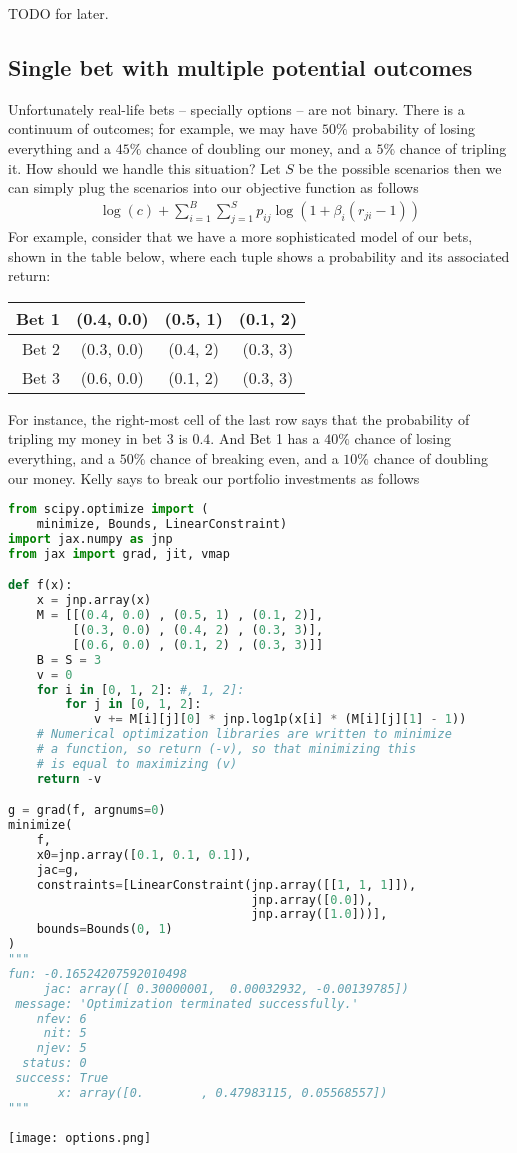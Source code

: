 \documentclass{article}
\begin{document}
TODO for later.

\subsection{Single bet with multiple potential outcomes}
Unfortunately real-life bets -- specially options -- are not binary. There is a continuum of outcomes; for example, we may have $50\%$ probability of losing everything and a $45\%$ chance of doubling our money, and a $5\%$ chance of tripling it. How should we handle this situation? Let $S$ be the possible scenarios then we can simply plug the scenarios into our objective function as follows
\begin{align}
\log(c) + \sum_{i=1}^B \sum_{j=1}^S p_{ij} \log(1 + \beta_i (r_{ji} -1)) 
\end{align}
For example, consider that we have a more sophisticated model of our bets, shown in the table below, where each tuple shows a probability and its associated return:

\begin{tabular}{r|c|c|c}
     Bet 1& (0.4, 0.0) & (0.5, 1) & (0.1, 2)\\\hline
     Bet 2& (0.3, 0.0) & (0.4, 2) & (0.3, 3)\\\hline
     Bet 3& (0.6, 0.0) & (0.1, 2) & (0.3, 3)\\
\end{tabular}

For instance, the right-most cell of the last row says that the probability of tripling my money in bet 3 is $0.4$. And Bet 1 has a $40\%$ chance of losing everything, and a $50\%$ chance of breaking even, and a $10\%$ chance of doubling our money. Kelly says to break our portfolio investments as follows

\begin{lstlisting}[language=Python]
from scipy.optimize import (
    minimize, Bounds, LinearConstraint)
import jax.numpy as jnp
from jax import grad, jit, vmap

def f(x):
    x = jnp.array(x)
    M = [[(0.4, 0.0) , (0.5, 1) , (0.1, 2)],
         [(0.3, 0.0) , (0.4, 2) , (0.3, 3)],
         [(0.6, 0.0) , (0.1, 2) , (0.3, 3)]]
    B = S = 3
    v = 0
    for i in [0, 1, 2]: #, 1, 2]:
        for j in [0, 1, 2]:
            v += M[i][j][0] * jnp.log1p(x[i] * (M[i][j][1] - 1))
    # Numerical optimization libraries are written to minimize
    # a function, so return (-v), so that minimizing this
    # is equal to maximizing (v)
    return -v

g = grad(f, argnums=0)
minimize(
    f,
    x0=jnp.array([0.1, 0.1, 0.1]), 
    jac=g, 
    constraints=[LinearConstraint(jnp.array([[1, 1, 1]]),
                                  jnp.array([0.0]),
                                  jnp.array([1.0]))],
    bounds=Bounds(0, 1)
)
"""
fun: -0.16524207592010498
     jac: array([ 0.30000001,  0.00032932, -0.00139785])
 message: 'Optimization terminated successfully.'
    nfev: 6
     nit: 5
    njev: 5
  status: 0
 success: True
       x: array([0.        , 0.47983115, 0.05568557])
"""
\end{lstlisting}


\texttt{[image: options.png]}
\end{document}
